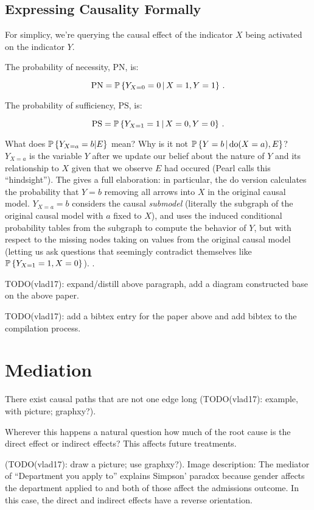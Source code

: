 \documentclass{article}
\begin{document}
\subsection{Expressing Causality Formally}

For simplicy, we're querying the causal effect of the indicator $X$ being activated on the indicator $Y$.

The probability of necessity, $\textrm{PN}$, is:

$$
\textrm{PN}=\operatorname{\mathbb{P}}\left\{ Y_{X=0}=0 \,\middle|\, X=1,Y=1 \right\}\,.
$$

The probability of sufficiency, $\textrm{PS}$, is:

$$
\textrm{PS}=\operatorname{\mathbb{P}}\left\{ Y_{X=1}=1 \,\middle|\, X=0,Y=0 \right\}\,.
$$

What does $\operatorname{\mathbb{P}}\left\{{Y_{X=a}=b|E}\right\}$ mean? Why is it not $\operatorname{\mathbb{P}}\left\{ Y=b \,\middle|\, \mathrm{do}(X=a), E \right\}$? $Y_{X=a}$ is the variable $Y$ after we update our belief about the nature of $Y$ and its relationship to $X$ given that we observe $E$ had occured (Pearl calls this ``hindsight''). The  gives a full elaboration: in particular, the $\mathrm{do}$ version calculates the probability that $Y=b$ removing all arrows into $X$ in the original causal model. $Y_{X=a}=b$ considers the causal \textit{submodel} (literally the subgraph of the original causal model with $a$ fixed to $X$), and uses the induced conditional probability tables from the subgraph to compute the behavior of $Y$, but with respect to the missing nodes taking on values from the original causal model (letting us ask questions that seemingly contradict themselves like $\operatorname{\mathbb{P}}\left\{{Y_{X=1}=1, X=0}\right\}$). \cite{pearl1999probabilities}.

TODO(vlad17): expand/distill above paragraph, add a diagram constructed base on the above paper.

TODO(vlad17): add a bibtex entry for the paper above and add bibtex to the compilation process.

\section{Mediation}

There exist causal paths that are not one edge long (TODO(vlad17): example, with picture; graphxy?).

Wherever this happens a natural question how much of the root cause is the direct effect or indirect effects? This affects future treatments.

(TODO(vlad17): draw a picture; use graphxy?). Image description: The mediator of ``Department you apply to'' explains Simpson' paradox because gender affects the department applied to and both of those affect the admissions outcome. In this case, the direct and indirect effects have a reverse orientation.
\end{document}
